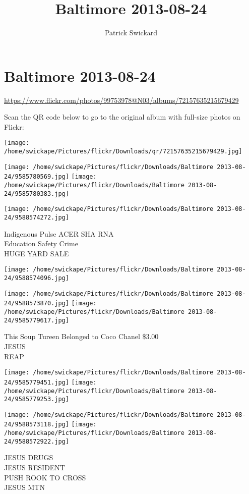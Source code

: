 \documentclass[10pt,letterpaper]{article}
\title{Baltimore 2013-08-24}
\author{Patrick Swickard}
\date{}
\begin{document}
\section*{Baltimore 2013-08-24}

\url{https://www.flickr.com/photos/99753978@N03/albums/72157635215679429}

Scan the QR code below to go to the original album with full-size photos on Flickr:

\texttt{[image: /home/swickape/Pictures/flickr/Downloads/qr/72157635215679429.jpg]}
\pagebreak

\texttt{[image: /home/swickape/Pictures/flickr/Downloads/Baltimore 2013-08-24/9585780569.jpg]}
\texttt{[image: /home/swickape/Pictures/flickr/Downloads/Baltimore 2013-08-24/9585780383.jpg]}

\texttt{[image: /home/swickape/Pictures/flickr/Downloads/Baltimore 2013-08-24/9588574272.jpg]}

Indigenous Pulse ACER SHA RNA\\
Education Safety Crime\\
HUGE YARD SALE
\pagebreak

\texttt{[image: /home/swickape/Pictures/flickr/Downloads/Baltimore 2013-08-24/9588574096.jpg]}

\vspace{0.25in}
\texttt{[image: /home/swickape/Pictures/flickr/Downloads/Baltimore 2013-08-24/9588573870.jpg]}
\texttt{[image: /home/swickape/Pictures/flickr/Downloads/Baltimore 2013-08-24/9585779617.jpg]}

This Soup Tureen Belonged to Coco Chanel \$3.00\\
JESUS\\
REAP
\pagebreak

\texttt{[image: /home/swickape/Pictures/flickr/Downloads/Baltimore 2013-08-24/9585779451.jpg]}
\texttt{[image: /home/swickape/Pictures/flickr/Downloads/Baltimore 2013-08-24/9585779253.jpg]}

\texttt{[image: /home/swickape/Pictures/flickr/Downloads/Baltimore 2013-08-24/9588573118.jpg]}
\texttt{[image: /home/swickape/Pictures/flickr/Downloads/Baltimore 2013-08-24/9588572922.jpg]}

JESUS DRUGS\\
JESUS RESIDENT\\
PUSH ROOK TO CROSS\\
JESUS MTN
\pagebreak
\end{document}
